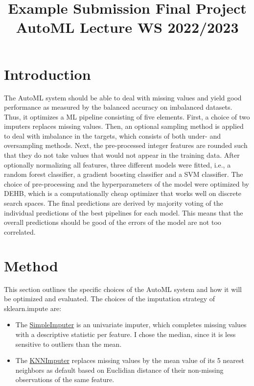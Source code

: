 \documentclass[11pt]{article}
\title{Example Submission Final Project AutoML Lecture WS 2022/2023}
\author[1]{\nameemail{Constantin von Crailsheim}{C.Crailsheim@campus.lmu.de}}
\affil[1]{LMU Munich, Institute of Statistics}
\begin{document}
\maketitle

\begin{abstract}
\end{abstract}



\section{Introduction}

The AutoML system should be able to deal with missing values and yield good performance as measured by the balanced accuracy on imbalanced datasets. Thus, it optimizes a ML pipeline consisting of five elements. First, a choice of two imputers replaces missing values. Then, an optional sampling method is applied to deal with imbalance in the targets, which consists of both under- and oversampling methods. Next, the pre-processed integer features are rounded such that they do not take values that would not appear in the training data. After optionally normalizing all features, three different models were fitted, i.e., a random forest classifier, a gradient boosting classifier and a SVM classifier. The choice of pre-processing and the hyperparameters of the model were optimized by DEHB, which is a computationally cheap optimizer that works well on discrete search spaces. The final predictions are derived by majority voting of the individual predictions of the best pipelines for each model. This means that the overall predictions should be good of the errors of the model are not too correlated.   

\section{Method}

This section outlines the specific choices of the AutoML system and how it will be optimized and evaluated. The choices of the imputation strategy of sklearn.impute are:
\begin{itemize}
\item The \href{https://scikit-learn.org/stable/modules/generated/sklearn.impute.SimpleImputer.html}{SimpleImputer} is an univariate imputer, which completes missing values with a descriptive statistic per feature. I chose the median, since it is less sensitive to outliers than the mean.
\item The \href{https://scikit-learn.org/stable/modules/generated/sklearn.impute.KNNImputer.html#sklearn.impute.KNNImputer}{KNNImputer} replaces missing values by the mean value of its 5 nearest neighbors as default based on Euclidian distance of their non-missing observations of the same feature. 
\end{itemize}
\end{document}
